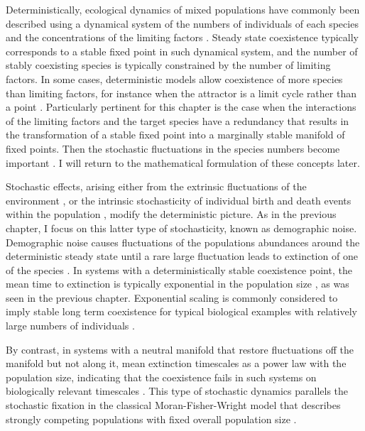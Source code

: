 Deterministically, ecological dynamics of mixed populations have commonly been described using a dynamical system of the numbers of individuals of each species and the concentrations of the limiting factors \cite{Armstrong1976,McGehee1977a,Armstrong1980}. 
Steady state coexistence typically corresponds to a stable fixed point in such dynamical system, and the number of stably coexisting species is typically constrained by the number of limiting factors. 
In some cases, deterministic models allow coexistence of more species than limiting factors, for instance when the attractor is a limit cycle rather than a point \cite{Smale1976,Armstrong1980}. 
Particularly pertinent for this chapter is the case when the interactions of the limiting factors and the target species have a redundancy that results in the transformation of a stable fixed point into a marginally stable manifold of fixed points. 
Then the stochastic fluctuations in the species numbers become important \cite{Volterra1926,Armstrong1980,Bomze1983,Chesson1990,Antal2006,Posfai2017}. 
I will return to the mathematical formulation of these concepts later. %

Stochastic effects, arising either from the extrinsic fluctuations of the environment \cite{Kamenev2008a,Chotibut2017b}, or the intrinsic stochasticity of individual birth and death events within the population \cite{Assaf2006,Gottesman2012,Dobrinevski2012,Gabel2013,Fisher2014,Constable2015,Lin2012,Chotibut2015,Young2018}, modify the deterministic picture. 
As in the previous chapter, I focus on this latter type of stochasticity, known as demographic noise. 
Demographic noise causes fluctuations of the populations abundances around the deterministic steady state until a rare large fluctuation leads to extinction of one of the species \cite{Kimura1968,Lin2012,Chotibut2015}. 
In systems with a deterministically stable coexistence point, the mean time to extinction is typically exponential in the population size \cite{Norden1982,Kamenev2008,Assaf2010,Ovaskainen2010}, as was seen in the previous chapter. 
Exponential scaling is commonly considered to imply stable long term coexistence for typical biological examples with relatively large numbers of individuals \cite{Ovaskainen2010,Lin2015}. 

By contrast, in systems with a neutral manifold that restore fluctuations off the manifold but not along it, mean extinction timescales as a power law with the population size, indicating that the coexistence fails in such systems on biologically relevant timescales \cite{Kimura1955,Moran1962,Lin2012,Chotibut2017a}. 
This type of stochastic dynamics parallels the stochastic fixation in the classical Moran-Fisher-Wright model that describes strongly competing populations with fixed overall population size \cite{Wright1931,Fisher1930,Moran1962,Kimura1968,Rice2004,Rogers2014,Stirk2010,Capitan2017}.

